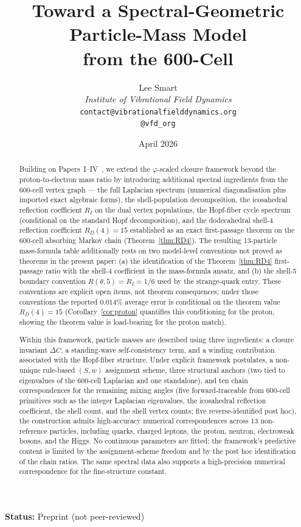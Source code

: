 \documentclass[12pt]{article}
\title{Toward a Spectral-Geometric Particle-Mass Model\\from the 600-Cell}
\author{%
  Lee Smart\\[4pt]
  \textit{Institute of Vibrational Field Dynamics}\\[2pt]
  \texttt{contact@vibrationalfielddynamics.org}\\[2pt]
  \texttt{@vfd\_org}%
}
\date{April 2026}
\newcommand{\phig}{\varphi}
\begin{document}
\maketitle

\noindent\textbf{Status:} Preprint (not peer-reviewed)

\begin{abstract}
Building on Papers~I--IV~\citep{SmartI, SmartII, SmartIII, SmartIV}, we extend the $\phig$-scaled closure framework beyond the proton-to-electron mass ratio by introducing additional spectral ingredients from the 600-cell vertex graph --- the full Laplacian spectrum (numerical diagonalisation plus imported exact algebraic forms), the shell-population decomposition, the icosahedral reflection coefficient $R_I$ on the dual vertex populations, the Hopf-fiber cycle spectrum (conditional on the standard Hopf decomposition), and the dodecahedral shell-4 reflection coefficient $R_D(4) = 15$ established as an exact first-passage theorem on the 600-cell absorbing Markov chain (Theorem~\ref{thm:RD4}). The resulting 13-particle mass-formula table additionally rests on two model-level conventions not proved as theorems in the present paper: (a) the identification of the Theorem~\ref{thm:RD4} first-passage ratio with the shell-4 coefficient in the mass-formula ansatz, and (b) the shell-5 boundary convention $R(\theta, 5) = R_I = 1/6$ used by the strange-quark entry. These conventions are explicit open items, not theorem consequences; under those conventions the reported $0.014\%$ average error is conditional on the theorem value $R_D(4) = 15$ (Corollary~\ref{cor:proton} quantifies this conditioning for the proton, showing the theorem value is load-bearing for the proton match).

Within this framework, particle masses are described using three ingredients: a closure invariant $\Delta C$, a standing-wave self-consistency term, and a winding contribution associated with the Hopf-fiber structure. Under explicit framework postulates, a non-unique rule-based $(S,w)$ assignment scheme, three structural anchors (two tied to eigenvalues of the 600-cell Laplacian and one standalone), and ten chain correspondences for the remaining mixing angles (five forward-traceable from 600-cell primitives such as the integer Laplacian eigenvalues, the icosahedral reflection coefficient, the shell count, and the shell vertex counts; five reverse-identified post hoc), the construction admits high-accuracy numerical correspondences across 13 non-reference particles, including quarks, charged leptons, the proton, neutron, electroweak bosons, and the Higgs. No continuous parameters are fitted; the framework's predictive content is limited by the assignment-scheme freedom and by the post hoc identification of the chain ratios. The same spectral data also supports a high-precision numerical correspondence for the fine-structure constant.


\end{abstract}
\end{document}
